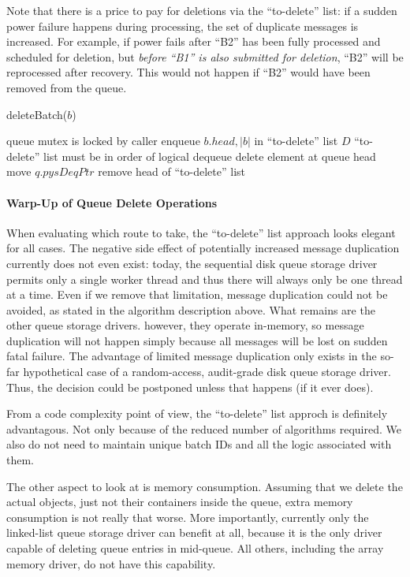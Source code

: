 \documentclass[a4paper,10pt]{article}
\begin{document}
Note that there is a price to pay for deletions via the ``to-delete'' list: if a sudden power failure happens during processing, the set of duplicate messages is increased. For example, if power fails after ``B2'' has been fully processed and scheduled for deletion, but \emph{before ``B1'' is also submitted for deletion}, ``B2'' will be reprocessed after recovery. This would not happen if ``B2'' would have been removed from the queue.

\begin{algorithm}
\caption{deleteBatch($b$)}
\begin{algorithmic}
\label{alg_phys_deq_seq_store}
\REQUIRE queue mutex is locked by caller
\STATE enqueue $b.head, |b|$ in ``to-delete'' list $D$
\COMMENT ``to-delete'' list must be in order of logical dequeue
		\STATE delete element at queue head
		\STATE move $q.pysDeqPtr$
	\ENDFOR
	\STATE remove head of ``to-delete'' list
\ENDWHILE 
\end{algorithmic}
\end{algorithm}

\paragraph{Warp-Up of Queue Delete Operations}
When evaluating which route to take, the ``to-delete'' list approach looks elegant for all cases. The negative side effect of potentially increased message duplication currently does not even exist: today, the sequential disk queue storage driver permits only a single worker thread and thus there will always only be one thread at a time. Even if we remove that limitation, message duplication could not be avoided, as stated in the algorithm description above. What remains are the other queue storage drivers. however, they operate in-memory, so message duplication will not happen simply because all messages will be lost on sudden fatal failure. The advantage of limited message duplication only exists in the so-far hypothetical case of a random-access, audit-grade disk queue storage driver. Thus, the decision could be postponed unless that happens (if it ever does).

From a code complexity point of view, the ``to-delete'' list approch is definitely advantagous. Not only because of the reduced number of algorithms required. We also do not need to maintain unique batch IDs and all the logic associated with them.

The other aspect to look at is memory consumption. Assuming that we delete the actual objects, just not their containers inside the queue, extra memory consumption is not really that worse. More importantly, currently only the linked-list queue storage driver can benefit at all, because it is the only driver capable of deleting queue entries in mid-queue. All others, including the array memory driver, do not have this capability.
\end{document}
